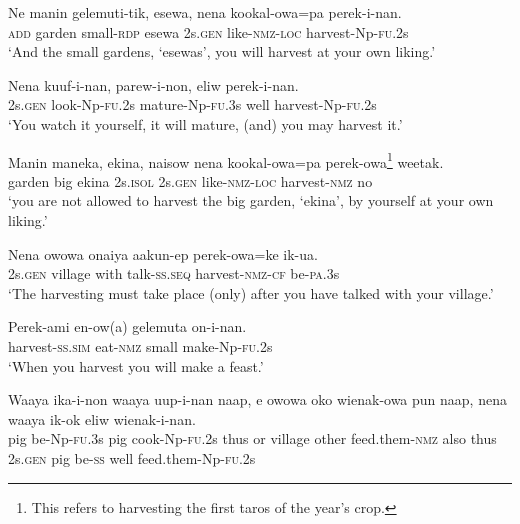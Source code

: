 \ea\label{ex:a:x16}
\gll  Ne  manin  gelemuti-tik,  esewa,  nena  kookal-owa=pa  perek-i-nan. \\
\textsc{add}  garden  small-\textsc{rdp}  esewa  2s.\textsc{gen}  like-\textsc{nmz}-\textsc{loc}  harvest-Np-\textsc{fu}.2s \\
\glt ‘And the small gardens, ‘esewas’, you will harvest at your own liking.’ \\
\z


\ea\label{ex:a:x17}
\gll  Nena  kuuf-i-nan,  parew-i-non,  eliw  perek-i-nan. \\
2s.\textsc{gen}  look-Np-\textsc{fu}.2s  mature-Np-\textsc{fu}.3s  well  harvest-Np-\textsc{fu}.2s \\
\glt ‘You watch it yourself, it will mature, (and) you may harvest it.’ \\
\z


\ea\label{ex:a:x18}
\gll  Manin  maneka,  ekina,  naisow  nena  kookal-owa=pa  perek-owa\footnote{ This refers to harvesting the first taros of the year’s crop.}  weetak. \\
garden  big  ekina  2s.\textsc{isol}  2s.\textsc{gen}  like-\textsc{nmz}-\textsc{loc}  harvest-\textsc{nmz}  no \\
\glt ‘you are not allowed to harvest the big garden, ‘ekina’, by yourself at  your own liking.’ \\
\z


\ea\label{ex:a:x19}
\gll  Nena  owowa  onaiya  aakun-ep  perek-owa=ke  ik-ua. \\
2s.\textsc{gen}  village  with  talk-\textsc{ss.seq}  harvest-\textsc{nmz}-\textsc{cf}  be-\textsc{pa}.3s \\
\glt ‘The harvesting must take place (only) after you have talked with your village.’ \\
\z


\ea\label{ex:a:x20}
\gll  Perek-ami  en-ow(a)  gelemuta  on-i-nan. \\
harvest-\textsc{ss}.\textsc{sim}  eat-\textsc{nmz}  small  make-Np-\textsc{fu}.2s \\
\glt ‘When you harvest you will make a feast.’ \\
\z


\ea\label{ex:a:x21}
\gll  Waaya  ika-i-non  waaya  uup-i-nan  naap,  e  owowa  oko   wienak-owa  pun  naap,  nena  waaya  ik-ok  eliw  wienak-i-nan. \\
pig  be-Np-\textsc{fu}.3s  pig  cook-Np-\textsc{fu}.2s  thus  or  village  other   feed.them-\textsc{nmz}  also  thus  2s.\textsc{gen}  pig  be-\textsc{ss}  well  feed.them-Np-\textsc{fu}.2s \\


